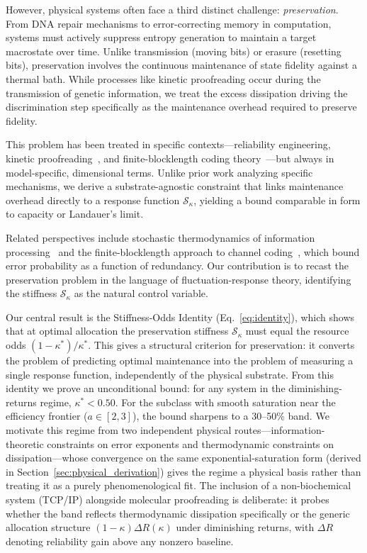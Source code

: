 \documentclass[11pt,twocolumn]{article}
\begin{document}
However, physical systems often face a third distinct challenge: \emph{preservation}. From DNA repair mechanisms to error-correcting memory in computation, systems must actively suppress entropy generation to maintain a target macrostate over time. Unlike transmission (moving bits) or erasure (resetting bits), preservation involves the continuous maintenance of state fidelity against a thermal bath. While processes like kinetic proofreading occur during the transmission of genetic information, we treat the excess dissipation driving the discrimination step specifically as the maintenance overhead required to preserve fidelity.

This problem has been treated in specific contexts---reliability engineering, kinetic proofreading~\cite{Hopfield1974}, and finite-blocklength coding theory~\cite{Gallager1965,Polyanskiy2010}---but always in model-specific, dimensional terms. Unlike prior work analyzing specific mechanisms, we derive a substrate-agnostic constraint that links maintenance overhead directly to a response function $\mathcal{S}_\kappa$, yielding a bound comparable in form to capacity or Landauer's limit.

Related perspectives include stochastic thermodynamics of information processing~\cite{Seifert2012,Parrondo2015} and the finite-blocklength approach to channel coding~\cite{Polyanskiy2010}, which bound error probability as a function of redundancy. Our contribution is to recast the preservation problem in the language of fluctuation-response theory, identifying the stiffness $\mathcal{S}_\kappa$ as the natural control variable.

Our central result is the Stiffness-Odds Identity (Eq.~\ref{eq:identity}), which shows that at optimal allocation the preservation stiffness $\mathcal{S}_\kappa$ must equal the resource odds $(1-\kappa^*)/\kappa^*$. This gives a structural criterion for preservation: it converts the problem of predicting optimal maintenance into the problem of measuring a single response function, independently of the physical substrate. From this identity we prove an unconditional bound: for any system in the diminishing-returns regime, $\kappa^* < 0.50$. For the subclass with smooth saturation near the efficiency frontier ($a \in [2,3]$), the bound sharpens to a 30--50\% band. We motivate this regime from two independent physical routes---information-theoretic constraints on error exponents and thermodynamic constraints on dissipation---whose convergence on the same exponential-saturation form (derived in Section~\ref{sec:physical_derivation}) gives the regime a physical basis rather than treating it as a purely phenomenological fit. The inclusion of a non-biochemical system (TCP/IP) alongside molecular proofreading is deliberate: it probes whether the band reflects thermodynamic dissipation specifically or the generic allocation structure $(1-\kappa)\Delta R(\kappa)$ under diminishing returns, with $\Delta R$ denoting reliability gain above any nonzero baseline.
\end{document}
